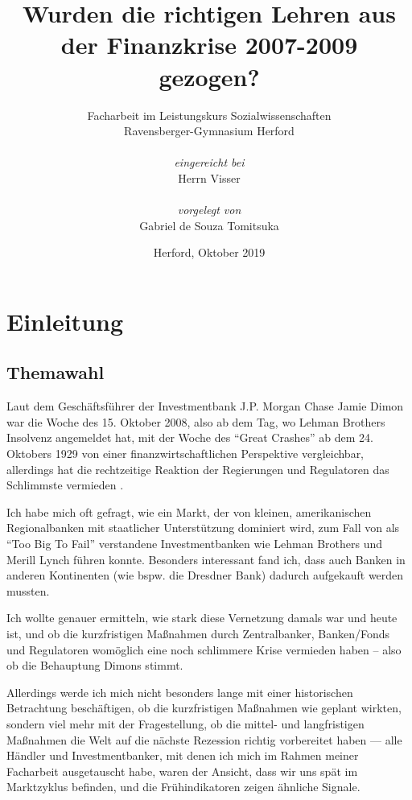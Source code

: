 \documentclass[a4paper,11pt]{report}
\begin{document}
\title{Wurden die richtigen Lehren aus der
    Finanzkrise 2007-2009 gezogen?}
\author{%
    Facharbeit im Leistungskurs Sozialwissenschaften \\
    Ravensberger-Gymnasium Herford \\ \\
    \textit{eingereicht bei} \\
    Herrn Visser \\ \\
    \textit{vorgelegt von} \\
    Gabriel de Souza Tomitsuka 
    }
\date{Herford, Oktober 2019}
\maketitle
\tableofcontents
\newpage
\chapter{Einleitung}
\section{Themawahl}
Laut dem Gesch\"aftsf\"uhrer der Investmentbank J.P. Morgan
Chase Jamie Dimon war die Woche des 15. Oktober 2008, also ab dem
Tag, wo Lehman Brothers Insolvenz angemeldet hat,
mit der Woche des \enquote{Great Crashes} ab dem 24. Oktobers 1929
von einer finanzwirtschaftlichen Perspektive vergleichbar,
allerdings hat die rechtzeitige Reaktion der Regierungen und
Regulatoren das Schlimmste vermieden \parencite{dimonyt}.

Ich habe mich oft gefragt, wie ein Markt, der
von kleinen, amerikanischen Regionalbanken mit
staatlicher Unterstützung
dominiert wird, zum Fall von als \enquote{Too Big To
Fail} verstandene Investmentbanken wie Lehman
Brothers und Merill Lynch
führen konnte. Besonders interessant fand ich,
dass auch Banken in anderen Kontinenten (wie
bspw. die Dresdner Bank) dadurch
aufgekauft werden mussten.

Ich wollte genauer
ermitteln, wie stark diese Vernetzung damals
war und heute ist, und ob
die kurzfristigen Maßnahmen durch
Zentralbanker, Banken/Fonds und Regulatoren
womöglich eine noch schlimmere Krise
vermieden haben -- also ob die Behauptung Dimons
stimmt.

Allerdings werde ich mich nicht besonders
lange mit einer historischen Betrachtung
beschäftigen, ob die kurzfristigen
Maßnahmen wie geplant wirkten, sondern viel
mehr mit der Fragestellung, ob die mittel- und
langfristigen Maßnahmen die Welt
auf die nächste Rezession richtig vorbereitet
haben --- alle Händler und Investmentbanker, mit
denen ich mich im Rahmen meiner Facharbeit ausgetauscht habe, waren
der Ansicht, dass wir uns spät im Marktzyklus
befinden, und die Frühindikatoren zeigen
ähnliche Signale.
\end{document}
